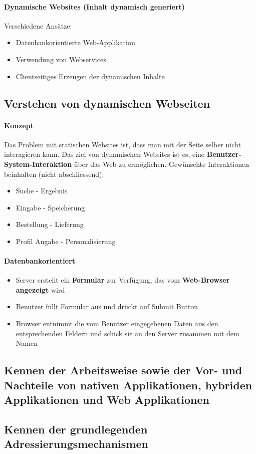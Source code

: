 \paragraph*{Dynamische Websites (Inhalt dynamisch generiert)} Verschiedene Ansätze:
\begin{itemize}[noitemsep,topsep=0pt,leftmargin=*]
    \item Datenbankorientierte Web-Applikation
    \item Verwendung von Webservices
    \item Clientseitiges Erzeugen der dynamischen Inhalte
\end{itemize}

\subsection{Verstehen von dynamischen Webseiten}
\paragraph*{Konzept}Das Problem mit statischen Websites ist, dass man mit der Seite selber nicht interagieren kann. Das ziel von dynamischen Websites ist es, eine \textbf{Benutzer-System-Interaktion} über das Web zu ermöglichen. Gewünschte Interaktionen beinhalten (nicht abschliessend):
\begin{itemize}[noitemsep,topsep=0pt,leftmargin=*]
    \item Suche - Ergebnis
    \item Eingabe - Speicherung
    \item Bestellung - Lieferung
    \item Profil Angabe - Personalisierung
\end{itemize}
\paragraph*{Datenbankorientiert}
\begin{itemize}[noitemsep,topsep=0pt,leftmargin=*]
    \item Server erstellt ein \textbf{Formular} zur Verfügung, das vom \textbf{Web-Browser angezeigt} wird
    \item Benutzer füllt Formular aus und drückt auf Submit Button
    \item Browser entnimmt die vom Benutzer eingegebenen Daten aus den entsprechenden Feldern und schick sie an den Server zusammen mit dem Namen
\end{itemize}

\subsection{Kennen der Arbeitsweise sowie der Vor- und Nachteile von nativen Applikationen, hybriden Applikationen und Web Applikationen}
\paragraph*{}

\subsection{Kennen der grundlegenden Adressierungsmechanismen}
\paragraph*{}
